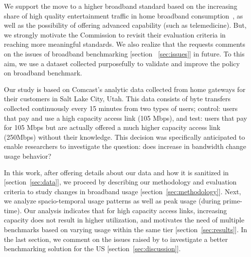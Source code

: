We support the move to a higher broadband standard based on the increasing share of high quality entertainment traffic in home broadband consumption~\cite{sandvine2014report1,sandvine2014report2}, as well as the possibility of offering advanced capability (such as telemedicine). But, we strongly motivate the Commission to revisit their evaluation criteria in reaching more meaningful standards. We also realize that the \FCC requests comments on the issues of broadband benchmarking [section ~\ref{sec:issues}] in future. To this aim, we use a dataset collected purposefully to validate and improve the \FCC policy on broadband benchmark.


Our study is based on Comcast’s analytic data collected from home gateways for their customers in
Salt Lake City, Utah. This data consists of byte transfers collected continuously every 15 minutes
from two types of users; control: users that pay and use a high capacity access link (105 Mbps), and
test: users that pay for 105 Mbps but are actually offered a much higher capacity access link
(250Mbps) without their knowledge. This decision was specifically anticipated to enable researchers
to investigate the question: does increase in bandwidth change usage behavior?




In this work, after offering details about our data and how it is sanitized in 
[section~\ref{sec:data}], we proceed by describing our methodology and evaluation criteria to study
changes in broadband usage [section~\ref{sec:methodology}]. Next, we analyze spacio-temporal
usage patterns as well as peak usage (during prime-time). Our analysis indicates that for high
capacity access links, increasing capacity does not result in higher utilization, and
motivates the need of multiple benchmarks based on varying usage within the same tier
[section~\ref{sec:results}]. In the last section, we comment on the issues raised by
 \FCC to investigate a better benchmarking solution for the US [section~\ref{sec:discussion}].